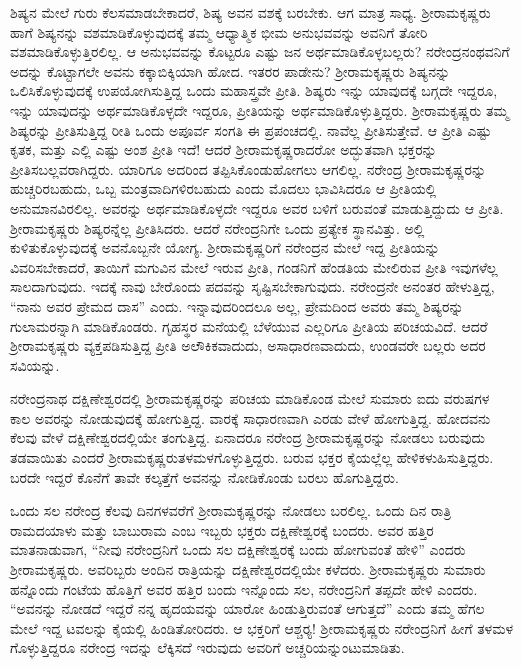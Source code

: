 ಶಿಷ್ಯನ ಮೇಲೆ ಗುರು ಕೆಲಸಮಾಡಬೇಕಾದರೆ, ಶಿಷ್ಯ ಅವನ ವಶಕ್ಕೆ ಬರಬೇಕು. ಆಗ ಮಾತ್ರ ಸಾಧ್ಯ. ಶ‍್ರೀರಾಮಕೃಷ್ಣರು ಹಾಗೆ ಶಿಷ್ಯನನ್ನು ವಶಮಾಡಿಕೊಳ್ಳುವು\-ದಕ್ಕೆ ತಮ್ಮ ಆಧ್ಯಾತ್ಮಿಕ ಭೀಮ ಅನುಭವವನ್ನು ಅವನಿಗೆ ತೋರಿ ವಶಮಾಡಿಕೊಳ್ಳುತ್ತಿರಲಿಲ್ಲ. ಆ ಅನುಭವವನ್ನು ಕೊಟ್ಟರೂ ಎಷ್ಟು ಜನ ಅರ್ಥಮಾಡಿಕೊಳ್ಳಬಲ್ಲರು? ನರೇಂದ್ರನಂಥವನಿಗೆ ಅದನ್ನು ಕೊಟ್ಟಾಗಲೇ ಅವನು ಕಕ್ಕಾಬಿಕ್ಕಿಯಾಗಿ ಹೋದ. ಇತರರ ಪಾಡೇನು? ಶ‍್ರೀರಾಮಕೃಷ್ಣರು ಶಿಷ್ಯನನ್ನು ಒಲಿಸಿಕೊಳ್ಳುವುದಕ್ಕೆ ಉಪಯೋಗಿಸುತ್ತಿದ್ದ ಒಂದು ಮಹಾಸ್ತ್ರವೇ ಪ್ರೀತಿ. ಶಿಷ್ಯರು ಇನ್ನು ಯಾವುದಕ್ಕೆ ಬಗ್ಗದೇ ಇದ್ದರೂ, ಇನ್ನು ಯಾವುದನ್ನು ಅರ್ಥಮಾಡಿಕೊಳ್ಳದೇ ಇದ್ದರೂ, ಪ್ರೀತಿಯನ್ನು ಅರ್ಥಮಾಡಿಕೊಳ್ಳುತ್ತಿದ್ದರು. ಶ‍್ರೀರಾಮಕೃಷ್ಣರು ತಮ್ಮ ಶಿಷ್ಯರನ್ನು ಪ್ರೀತಿಸುತ್ತಿದ್ದ ರೀತಿ ಒಂದು ಅಪೂರ್ವ ಸಂಗತಿ ಈ ಪ್ರಪಂಚದಲ್ಲಿ. ನಾವೆಲ್ಲ ಪ್ರೀತಿಸುತ್ತೇವೆ. ಆ ಪ್ರೀತಿ ಎಷ್ಟು ಕೃತಕ, ಮತ್ತು ಎಲ್ಲಿ ಎಷ್ಟು ಅಂಶ ಪ್ರೀತಿ ಇದೆ! ಆದರೆ ಶ‍್ರೀರಾಮಕೃಷ್ಣರಾದರೋ ಅದ್ಭುತವಾಗಿ ಭಕ್ತರನ್ನು ಪ್ರೀತಿಸಬಲ್ಲವರಾಗಿದ್ದರು. ಯಾರಿಗೂ ಅದರಿಂದ ತಪ್ಪಿಸಿಕೊಂಡುಹೋಗಲು ಆಗಲಿಲ್ಲ. ನರೇಂದ್ರ ಶ‍್ರೀರಾಮಕೃಷ್ಣರನ್ನು ಹುಚ್ಚರಿರಬಹುದು, ಒಬ್ಬ ಮಂತ್ರವಾದಿಗಳಿರಬಹುದು ಎಂದು ಮೊದಲು ಭಾವಿಸಿದರೂ ಆ ಪ್ರೀತಿಯಲ್ಲಿ ಅನುಮಾನವಿರಲಿಲ್ಲ. ಅವರನ್ನು ಅರ್ಥಮಾಡಿಕೊಳ್ಳದೇ ಇದ್ದರೂ ಅವರ ಬಳಿಗೆ ಬರುವಂತೆ ಮಾಡುತ್ತಿದ್ದುದು ಆ ಪ್ರೀತಿ. ಶ‍್ರೀರಾಮಕೃಷ್ಣರು ಶಿಷ್ಯರನ್ನೆಲ್ಲ ಪ್ರೀತಿಸಿದರು. ಆದರೆ ನರೇಂದ್ರನಿಗೇ ಒಂದು ಪ್ರತ್ಯೇಕ ಸ್ಥಾನವಿತ್ತು. ಅಲ್ಲಿ ಕುಳಿತುಕೊಳ್ಳುವುದಕ್ಕೆ ಅವನೊಬ್ಬನೇ ಯೋಗ್ಯ. ಶ‍್ರೀರಾಮಕೃಷ್ಣರಿಗೆ ನರೇಂದ್ರನ ಮೇಲೆ ಇದ್ದ ಪ್ರೀತಿಯನ್ನು ವಿವರಿಸಬೇಕಾದರೆ, ತಾಯಿಗೆ ಮಗುವಿನ ಮೇಲೆ ಇರುವ ಪ್ರೀತಿ, ಗಂಡನಿಗೆ ಹೆಂಡತಿಯ ಮೇಲಿರುವ ಪ್ರೀತಿ ಇವುಗಳೆಲ್ಲ ಸಾಲದಾಗುವುದು. ಇದಕ್ಕೆ ನಾವು ಬೇರೊಂದು ಪದವನ್ನು ಸೃಷ್ಟಿಸಬೇಕಾಗುವುದು. ನರೇಂದ್ರನೇ ಅನಂತರ ಹೇಳುತ್ತಿದ್ದ, “ನಾನು ಅವರ ಪ್ರೇಮದ ದಾಸ” ಎಂದು. ಇನ್ನಾವುದರಿಂದಲೂ ಅಲ್ಲ, ಪ್ರೇಮದಿಂದ ಅವರು ತಮ್ಮ ಶಿಷ್ಯರನ್ನು ಗುಲಾಮರನ್ನಾಗಿ ಮಾಡಿಕೊಂಡರು. ಗೃಹಸ್ಥರ ಮನೆಯಲ್ಲಿ ಬೆಳೆಯುವ ಎಲ್ಲರಿಗೂ ಪ್ರೀತಿಯ ಪರಿಚಯವಿದೆ. ಆದರೆ ಶ‍್ರೀರಾಮಕೃಷ್ಣರು ವ್ಯಕ್ತಪಡಿಸುತ್ತಿದ್ದ ಪ್ರೀತಿ ಅಲೌಕಿಕವಾದುದು, ಅಸಾಧಾರಣವಾದುದು, ಉಂಡವರೇ ಬಲ್ಲರು ಅದರ ಸವಿಯನ್ನು.

ನರೇಂದ್ರನಾಥ ದಕ್ಷಿಣೇಶ್ವರದಲ್ಲಿ ಶ‍್ರೀರಾಮಕೃಷ್ಣರನ್ನು ಪರಿಚಯ ಮಾಡಿಕೊಂಡ ಮೇಲೆ ಸುಮಾರು ಐದು ವರುಷಗಳ ಕಾಲ ಅವರನ್ನು ನೋಡುವುದಕ್ಕೆ ಹೋಗುತ್ತಿದ್ದ. ವಾರಕ್ಕೆ ಸಾಧಾರಣವಾಗಿ ಎರಡು ವೇಳೆ ಹೋಗುತ್ತಿದ್ದ. ಹೋದವನು ಕೆಲವು ವೇಳೆ ದಕ್ಷಿಣೇಶ್ವರದಲ್ಲಿಯೇ ತಂಗುತ್ತಿದ್ದ. ಏನಾದರೂ ನರೇಂದ್ರ ಶ‍್ರೀರಾಮಕೃಷ್ಣರನ್ನು ನೋಡಲು ಬರುವುದು ತಡವಾಯಿತು ಎಂದರೆ ಶ‍್ರೀರಾಮಕೃಷ್ಣರು\break ತಳಮಳಗೊಳ್ಳುತ್ತಿದ್ದರು. ಬರುವ ಭಕ್ತರ ಕೈಯಲ್ಲೆಲ್ಲ ಹೇಳಿಕಳುಹಿಸುತ್ತಿದ್ದರು. ಬರದೇ ಇದ್ದರೆ ಕೊನೆಗೆ ತಾವೇ ಕಲ್ಕತ್ತೆಗೆ ಅವನನ್ನು ನೋಡಿಕೊಂಡು ಬರಲು ಹೊಗುತ್ತಿದ್ದರು.

ಒಂದು ಸಲ ನರೇಂದ್ರ ಕೆಲವು ದಿನಗಳವರೆಗೆ ಶ‍್ರೀರಾಮಕೃಷ್ಣರನ್ನು ನೋಡಲು ಬರಲಿಲ್ಲ. ಒಂದು ದಿನ ರಾತ್ರಿ ರಾಮದಯಾಳು ಮತ್ತು ಬಾಬುರಾಮ ಎಂಬ ಇಬ್ಬರು ಭಕ್ತರು ದಕ್ಷಿಣೇಶ್ವರಕ್ಕೆ ಬಂದರು. ಅವರ ಹತ್ತಿರ ಮಾತನಾಡುವಾಗ, “ನೀವು ನರೇಂದ್ರನಿಗೆ ಒಂದು ಸಲ ದಕ್ಷಿಣೇಶ್ವರಕ್ಕೆ ಬಂದು ಹೋಗುವಂತೆ ಹೇಳಿ” ಎಂದರು ಶ‍್ರೀರಾಮಕೃಷ್ಣರು. ಅವರಿಬ್ಬರು ಅಂದಿನ ರಾತ್ರಿಯನ್ನು ದಕ್ಷಿಣೇಶ್ವರದಲ್ಲಿಯೇ ಕಳೆದರು. ಶ‍್ರೀರಾಮಕೃಷ್ಣರು ಸುಮಾರು ಹನ್ನೊಂದು ಗಂಟೆಯ ಹೊತ್ತಿಗೆ ಅವರ ಹತ್ತಿರ ಬಂದು ಇನ್ನೊಂದು ಸಲ, ನರೇಂದ್ರನಿಗೆ ತಪ್ಪದೇ ಹೇಳಿ ಎಂದರು. “ಅವನನ್ನು ನೋಡದೆ ಇದ್ದರೆ ನನ್ನ ಹೃದಯವನ್ನು ಯಾರೋ ಹಿಂಡುತ್ತಿರುವಂತೆ ಆಗುತ್ತದೆ” ಎಂದು ತಮ್ಮ ಹೆಗಲ ಮೇಲೆ ಇದ್ದ ಟವಲನ್ನು ಕೈಯಲ್ಲಿ ಹಿಂಡಿತೋರಿದರು. ಆ ಭಕ್ತರಿಗೆ ಆಶ್ಚರ‍್ಯ! ಶ‍್ರೀರಾಮಕೃಷ್ಣರು ನರೇಂದ್ರನಿಗೆ ಹೀಗೆ ತಳಮಳ ಗೊಳ್ಳುತ್ತಿದ್ದರೂ ನರೇಂದ್ರ ಇದನ್ನು ಲೆಕ್ಕಿಸದೆ ಇರುವುದು ಅವರಿಗೆ ಅಚ್ಚರಿಯನ್ನುಂಟುಮಾಡಿತು.

